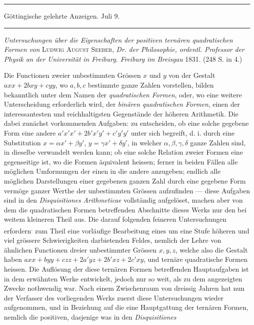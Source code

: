 %
\begin{center}
\rule{.86\linewidth}{.3pt}\par
Göttingische gelehrte Anzeigen. Juli 9.\par
\rule{.86\linewidth}{.3pt}
\end{center}
\emph{Untersuchungen über die Eigenschaften der positiven ternären quadratischen Formen von} \textsc{Ludwig August Seeber}, \emph{Dr. der Philosophie, ordentl. Professor der Physik an der Universität in Freiburg. Freiburg im Breisgau} 1831. (248 S. in 4.)

Die Functionen zweier unbestimmten Grössen $x$ und $y$ von der Gestalt $axx+2bxy+cyy$, wo $a,b,c$ bestimmte ganze Zahlen vorstellen, bilden bekanntlich unter dem Namen der \emph{quadratischen Formen}, oder, wo eine weitere Unterscheidung erforderlich wird, der \emph{binären quadratischen Formen}, einen der interessantesten und reichhaltigsten Gegenstände der höheren Arithmetik. Die dabei zunächst vorkommenden Aufgaben: zu entscheiden, ob eine solche gegebene Form eine andere $a'x'x'+2b'x'y'+c'y'y'$ unter sich begreift, d. i. durch eine Substitution $x=\alpha x'+\beta y'$, $y=\gamma x'+\delta y'$, in welcher $\alpha,\beta,\gamma,\delta$ ganze Zahlen sind, in dieselbe verwandelt werden kann; ob eine solche Relation zweier Formen eine gegenseitige ist, wo die Formen äquivalent heissen; ferner in beiden Fällen alle möglichen Umformungen der einen in die andere anzugeben; endlich alle möglichen Darstellungen einer gegebenen ganzen Zahl durch eine gegebene Form vermöge ganzer Werthe der unbestimmten Grössen aufzufinden --- diese Aufgaben sind in den \emph{Disquisitiones Arithmeticae} vollständig aufgelöset, machen aber von dem die quadratischen Formen betreffenden Abschnitte dieses Werks nur den bei weitem kleineren Theil aus. Die darauf folgenden feineren Untersuchungen erfordern\textsuperscript{.} zum Theil eine vorläufige Bearbeitung eines um eine Stufe höheren und viel grössere Schwierigkeiten darbietenden Feldes, nemlich der Lehre von ähnlichen Functionen dreier unbestimmter Grössen $x,y,z$, welche also die Gestalt haben $axx+byy+czz+2a'yz+2b'xz+2c'xy$, und ternäre quadratische Formen heissen. Die Auflösung der diese ternären Formen betreffenden Hauptaufgaben ist in dem erwähnten Werke entwickelt, jedoch nur so weit, als zu dem angezeigten Zwecke nothwendig war. Nach einem Zwischenraum von dreissig Jahren hat nun der Verfasser des vorliegenden Werks zuerst diese Untersuchungen wieder aufgenommen, und in Beziehung auf die eine Hauptgattung der ternären Formen, nemlich die positiven, dasjenige was in den \emph{Disquisitiones }
